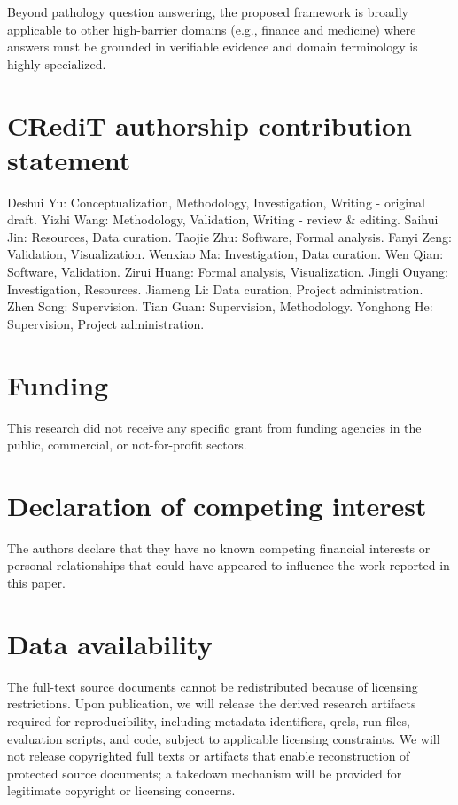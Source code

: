 \documentclass[preprint,12pt,a4paper]{elsarticle}
\begin{document}
Beyond pathology question answering, the proposed framework is broadly applicable to other high-barrier domains (e.g., finance and medicine) where answers must be grounded in verifiable evidence and domain terminology is highly specialized.

\section*{CRediT authorship contribution statement}
Deshui Yu: Conceptualization, Methodology, Investigation, Writing - original draft. Yizhi Wang: Methodology, Validation, Writing - review \& editing. Saihui Jin: Resources, Data curation. Taojie Zhu: Software, Formal analysis. Fanyi Zeng: Validation, Visualization. Wenxiao Ma: Investigation, Data curation. Wen Qian: Software, Validation. Zirui Huang: Formal analysis, Visualization. Jingli Ouyang: Investigation, Resources. Jiameng Li: Data curation, Project administration. Zhen Song: Supervision. Tian Guan: Supervision, Methodology. Yonghong He: Supervision, Project administration.

\section*{Funding}
This research did not receive any specific grant from funding agencies in the public, commercial, or not-for-profit sectors.

\section*{Declaration of competing interest}
The authors declare that they have no known competing financial interests or personal relationships that could have appeared to influence the work reported in this paper.

\section*{Data availability}
The full-text source documents cannot be redistributed because of licensing restrictions. Upon publication, we will release the derived research artifacts required for reproducibility, including metadata identifiers, qrels, run files, evaluation scripts, and code, subject to applicable licensing constraints.
We will not release copyrighted full texts or artifacts that enable reconstruction of protected source documents; a takedown mechanism will be provided for legitimate copyright or licensing concerns.



\end{document}
